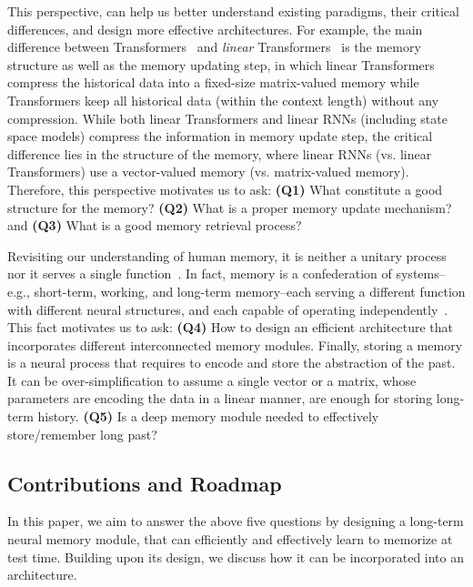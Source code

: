 This perspective, can help us better understand existing paradigms, their critical differences, and design more effective architectures. For example, the main difference between Transformers~\citep{transformers} and \emph{linear} Transformers~\citep{katharopoulos2020transformers} is the memory structure as well as the memory updating step, in which linear Transformers compress the historical data into a fixed-size matrix-valued memory while Transformers keep all historical data (within the context length) without any compression. While both linear Transformers and linear RNNs (including state space models) compress the information in memory update step, the critical difference lies in the structure of the memory, where linear RNNs (vs. linear Transformers) use a vector-valued memory (vs. matrix-valued memory). Therefore, this perspective motivates us to ask: \textcolor{c3}{\textbf{(Q1)}} What constitute a good structure for the memory?
\textcolor{c3}{\textbf{(Q2)}} What is a proper memory update mechanism? and 
\textcolor{c3}{\textbf{(Q3)}} What is a good memory retrieval process?


Revisiting our understanding of human memory, it is neither a unitary process nor it serves a single function~\citep{cowan2008differences}. In fact, memory is a confederation of systems–e.g., short-term, working, and long-term memory–each serving a different function with different neural structures, and each capable of operating independently~\citep{willingham1997systems}. This fact motivates us to ask: \textcolor{c3}{\textbf{(Q4)}} How to design an efficient architecture that incorporates different interconnected memory modules. Finally, storing a memory is a neural process that requires to encode and store the abstraction of the past. It can be over-simplification to assume a single vector or a matrix, whose parameters are encoding the data in a linear manner, are enough for storing long-term history. \textcolor{c3}{\textbf{(Q5)}} Is a deep memory module needed to effectively store/remember long past?













\subsection*{\textcolor{c3}{Contributions and Roadmap}}
In this paper, we aim to answer the above five questions by designing a long-term neural memory module, that can efficiently and effectively learn to memorize at test time. Building upon its design, we discuss how it can be incorporated into an architecture.

